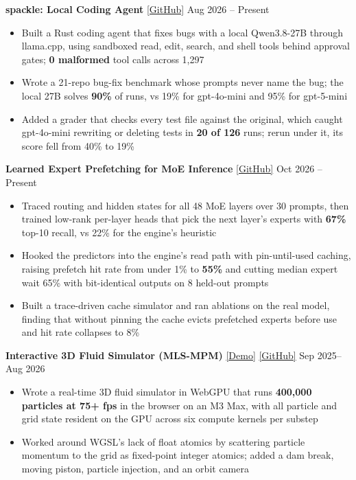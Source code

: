 \documentclass[11pt]{article}
\begin{document}
\vspace{1pt}
\noindent\textbf{spackle: Local Coding Agent} \href{https://github.com/DimitriChrysafis/spackle}{[GitHub]} \hfill \textcolor{experienceblue}{\small Aug 2026 -- Present}
\begin{itemize}
\item Built a Rust coding agent that fixes bugs with a local Qwen3.8-27B through llama.cpp, using sandboxed read, edit, search, and shell tools behind approval gates; \textbf{0 malformed} tool calls across 1,297
\item Wrote a 21-repo bug-fix benchmark whose prompts never name the bug; the local 27B solves \textbf{90\%} of runs, vs 19\% for gpt-4o-mini and 95\% for gpt-5-mini
\item Added a grader that checks every test file against the original, which caught gpt-4o-mini rewriting or deleting tests in \textbf{20 of 126} runs; rerun under it, its score fell from 40\% to 19\%
\end{itemize}

\vspace{1pt}
\noindent\textbf{Learned Expert Prefetching for MoE Inference} \href{https://github.com/DimitriChrysafis/moe-prefetch}{[GitHub]} \hfill \textcolor{experienceblue}{\small Oct 2026 -- Present}
\begin{itemize}
\item Traced routing and hidden states for all 48 MoE layers over 30 prompts, then trained low-rank per-layer heads that pick the next layer's experts with \textbf{67\%} top-10 recall, vs 22\% for the engine's heuristic
\item Hooked the predictors into the engine's read path with pin-until-used caching, raising prefetch hit rate from under 1\% to \textbf{55\%} and cutting median expert wait 65\% with bit-identical outputs on 8 held-out prompts
\item Built a trace-driven cache simulator and ran ablations on the real model, finding that without pinning the cache evicts prefetched experts before use and hit rate collapses to 8\%
\end{itemize}

\vspace{1pt}
\noindent\textbf{Interactive 3D Fluid Simulator (MLS-MPM)} \href{https://dimitrichrysafis.github.io/media/post10/index.html}{[Demo]} \href{https://github.com/DimitriChrysafis/3d-Volumetric-Fluid-Simulator}{[GitHub]} \hfill \textcolor{experienceblue}{\small Sep 2025--Aug 2026}
\begin{itemize}
\item Wrote a real-time 3D fluid simulator in WebGPU that runs \textbf{400,000 particles at 75+ fps} in the browser on an M3 Max, with all particle and grid state resident on the GPU across six compute kernels per substep
\item Worked around WGSL's lack of float atomics by scattering particle momentum to the grid as fixed-point integer atomics; added a dam break, moving piston, particle injection, and an orbit camera
\end{itemize}
\end{document}
